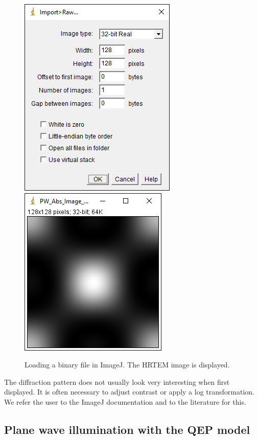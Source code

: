 \documentclass[12pt,a4paper]{article}
\begin{document}
\begin{figure}[!h]
\begin{center}
    \includegraphics[scale=0.75]{ImageJ_ImportRaw.png}
    \includegraphics[scale=0.75]{pw_abs_image.png}
\caption{Loading a binary file in ImageJ. The HRTEM image is displayed.}
\label{fig:ImageJ_ImportRaw}
\end{center}
\end{figure}

The diffraction pattern does not usually look very interesting when first displayed.
It is often necessary to adjust contrast or apply a log transformation.
We refer the user to the ImageJ documentation and to the literature for this.





\subsection{Plane wave illumination with the QEP model}
\label{qep_hrtem}
\end{document}

